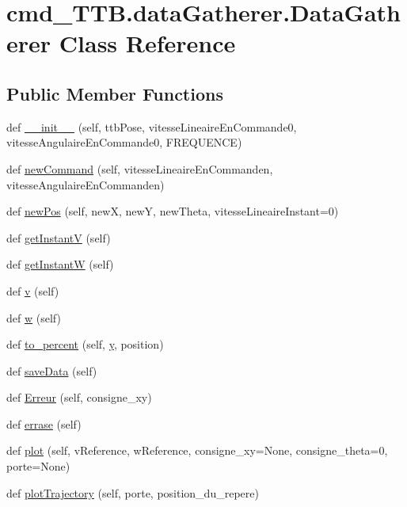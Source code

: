 \hypertarget{classcmd__TTB_1_1dataGatherer_1_1DataGatherer}{}\section{cmd\+\_\+\+T\+T\+B.\+data\+Gatherer.\+Data\+Gatherer Class Reference}
\label{classcmd__TTB_1_1dataGatherer_1_1DataGatherer}
\subsection*{Public Member Functions}
\begin{DoxyCompactItemize}
\item 
def \hyperlink{classcmd__TTB_1_1dataGatherer_1_1DataGatherer_acbea9abbb037555264b3c5d326560670}{\+\_\+\+\_\+init\+\_\+\+\_\+} (self, ttb\+Pose, vitesse\+Lineaire\+En\+Commande0, vitesse\+Angulaire\+En\+Commande0, F\+R\+E\+Q\+U\+E\+N\+CE)
\item 
def \hyperlink{classcmd__TTB_1_1dataGatherer_1_1DataGatherer_aa9c1979d72538a306c22fb573a0076b7}{new\+Command} (self, vitesse\+Lineaire\+En\+Commanden, vitesse\+Angulaire\+En\+Commanden)
\item 
def \hyperlink{classcmd__TTB_1_1dataGatherer_1_1DataGatherer_a22be32d8a6818d2bd0d0cfcc06d2d58f}{new\+Pos} (self, newX, newY, new\+Theta, vitesse\+Lineaire\+Instant=0)
\item 
def \hyperlink{classcmd__TTB_1_1dataGatherer_1_1DataGatherer_a2bf0a24ac3fc5a9a76bc1eefebf31334}{get\+InstantV} (self)
\item 
def \hyperlink{classcmd__TTB_1_1dataGatherer_1_1DataGatherer_a875c925135b3f187974f15a322f692aa}{get\+InstantW} (self)
\item 
def \hyperlink{classcmd__TTB_1_1dataGatherer_1_1DataGatherer_a1a6ea334eab99d499f23e05b68af46c1}{v} (self)
\item 
def \hyperlink{classcmd__TTB_1_1dataGatherer_1_1DataGatherer_ae41c1980d73278b1d973713988729b9d}{w} (self)
\item 
def \hyperlink{classcmd__TTB_1_1dataGatherer_1_1DataGatherer_adad43343ec9a615148fd26377eabc3b8}{to\+\_\+percent} (self, \hyperlink{classcmd__TTB_1_1dataGatherer_1_1DataGatherer_a3b8b2b639cad9c1192ef10efa68f2b51}{y}, position)
\item 
def \hyperlink{classcmd__TTB_1_1dataGatherer_1_1DataGatherer_a7fd8d77061ff08059ba8deea2d184d93}{save\+Data} (self)
\item 
def \hyperlink{classcmd__TTB_1_1dataGatherer_1_1DataGatherer_a55e8ac388f6a9e4ad794b8561559c52d}{Erreur} (self, consigne\+\_\+xy)
\item 
def \hyperlink{classcmd__TTB_1_1dataGatherer_1_1DataGatherer_a90a816bc1b190fda1e557c187eecb2a1}{errase} (self)
\item 
def \hyperlink{classcmd__TTB_1_1dataGatherer_1_1DataGatherer_a93a58d2eb75f586e0747278409fb8ef6}{plot} (self, v\+Reference, w\+Reference, consigne\+\_\+xy=None, consigne\+\_\+theta=0, porte=None)
\item 
def \hyperlink{classcmd__TTB_1_1dataGatherer_1_1DataGatherer_afe246ad25d224494702fcc6eaddf57fe}{plot\+Trajectory} (self, porte, position\+\_\+du\+\_\+repere)
\end{DoxyCompactItemize}
